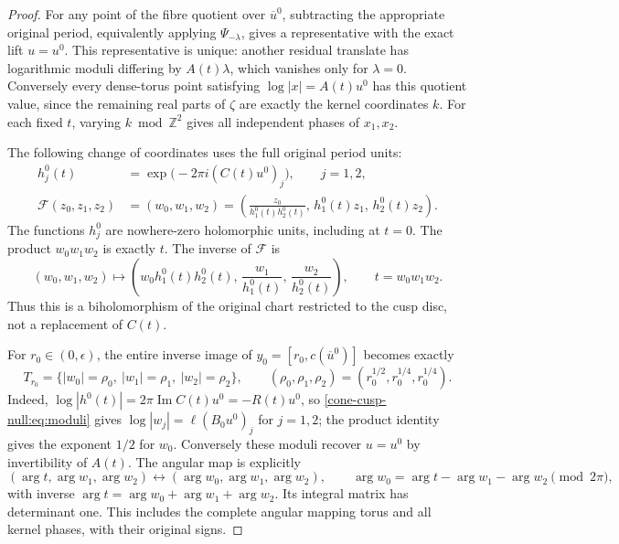 \documentclass[11pt,letterpaper]{article}
\numberwithin{equation}{section}
\theoremstyle{definition}
\theoremstyle{remark}
\begin{document}
\begin{proof}
For any point of the fibre quotient over \(\overline u^0\), subtracting
the appropriate original period, equivalently applying
\(\Psi_{-\lambda}\), gives a representative with the exact lift
\(u=u^0\). This representative is unique: another residual translate
has logarithmic moduli differing by \(A(t)\lambda\), which vanishes
only for \(\lambda=0\). Conversely every dense-torus point satisfying
\(\log|x|=A(t)u^0\) has this quotient value, since the remaining real
parts of \(\zeta\) are exactly the kernel coordinates \(k\).
For each fixed \(t\), varying \(k\bmod\mathbb Z^2\) gives all independent
phases of \(x_1,x_2\).

The following change of coordinates uses the full original period units:
\begin{align}
 h_j^0(t)&=\exp\bigl(-2\pi i(C(t)u^0)_j\bigr),\qquad j=1,2,\\
 \mathcal F(z_0,z_1,z_2)
 &=(w_0,w_1,w_2)
 =\left(\frac{z_0}{h_1^0(t)h_2^0(t)},\,
 h_1^0(t)z_1,\,h_2^0(t)z_2\right).
 \label{cone-cusp-null:eq:straightening}
\end{align}
The functions \(h_j^0\) are nowhere-zero holomorphic units, including
at \(t=0\). The product \(w_0w_1w_2\) is exactly \(t\).
The inverse of \(\mathcal F\) is
\[
 (w_0,w_1,w_2)\longmapsto
 \left(w_0h_1^0(t)h_2^0(t),\,
 \frac{w_1}{h_1^0(t)},\,\frac{w_2}{h_2^0(t)}\right),
 \qquad t=w_0w_1w_2.
\]
Thus this is a biholomorphism of the original chart restricted to the
cusp disc, not a replacement of \(C(t)\).

For \(r_0\in(0,\epsilon)\), the entire inverse image of
\(y_0=[r_0,c(\overline u^0)]\) becomes exactly
\begin{equation}
 T_{r_0}=
 \{|w_0|=\rho_0,\ |w_1|=\rho_1,\ |w_2|=\rho_2\},\qquad
 (\rho_0,\rho_1,\rho_2)=
 (r_0^{1/2},r_0^{1/4},r_0^{1/4}).
 \label{cone-cusp-null:eq:torus}
\end{equation}
Indeed, \(\log|h^0(t)|=2\pi\operatorname{Im}C(t)u^0=-R(t)u^0\),
so \eqref{cone-cusp-null:eq:moduli} gives \(\log|w_j|=\ell(B_0u^0)_j\) for
\(j=1,2\); the product identity gives the exponent \(1/2\) for
\(w_0\). Conversely these moduli recover \(u=u^0\) by invertibility
of \(A(t)\). The angular map is explicitly
\[
 (\arg t,\arg w_1,\arg w_2)\longleftrightarrow
 (\arg w_0,\arg w_1,\arg w_2),\qquad
 \arg w_0=\arg t-\arg w_1-\arg w_2\pmod{2\pi},
\]
with inverse \(\arg t=\arg w_0+\arg w_1+\arg w_2\).
Its integral matrix has determinant one. This includes the complete
angular mapping torus and all kernel phases, with their original signs.


\end{proof}
\end{document}
